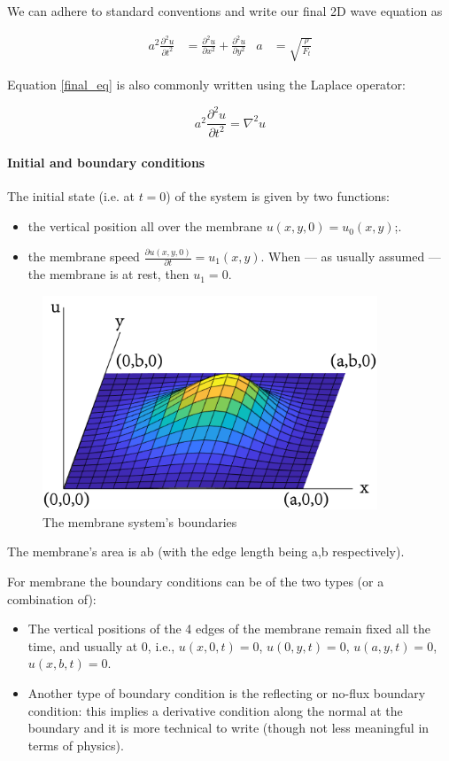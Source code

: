 \noindent We can adhere to standard conventions and write our final 2D wave equation as 


\begin{align}
a^2 \frac{\partial^2u}{\partial t^2} &= \frac{\partial^2 u}{\partial x^2} + \frac{\partial^2 u}{\partial y^2} & a &= \sqrt{\frac{\rho}{F_t}}
\label{final_eq}
\end{align}

\noindent Equation \ref{final_eq} is also commonly written using the Laplace operator:

\begin{equation}
a^2 \frac{\partial^2u}{\partial t^2} = \nabla^2 u
\end{equation}

\paragraph{Initial and boundary conditions}
The initial state (i.e. at $t=0$) of the system is given by two functions:
\begin{itemize}
	\item the vertical position all over the membrane $u(x,y,0)=u_0(x,y)$;.
  \item the membrane speed $\frac{\partial u(x,y,0)}{\partial t}=u_1(x,y)$. When --- as usually assumed --- the membrane is at rest, then $u_1=0$.
\end{itemize}
\begin{figure}[htb]
	\centering
	\includegraphics[width=10cm]{Figures/2D_waves_boundary_conditions.png}       
	\caption{The membrane system's boundaries}
	\label{2D_waves_boundary_conditions.fig}
\end{figure}
\noindent The membrane's area is ab (with the edge length being a,b respectively).

For membrane the boundary conditions can be of the two types (or a combination of): 
\begin{itemize}
	\item The vertical positions of the 4 edges of the membrane remain fixed all the time, and usually at 0, i.e., $u(x,0,t)=0$, $u(0,y,t)=0$, $u(a,y,t)=0$, $u(x,b,t)=0$.
	\item Another type of boundary condition is the reflecting or no-flux boundary condition: this implies a derivative condition along the normal at the boundary and it is more technical to write (though not less meaningful in terms of physics).
\end{itemize}

